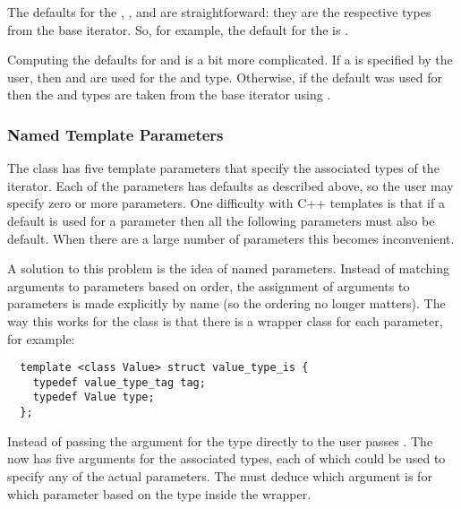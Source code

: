\documentclass{netobjectdays}
\begin{document}
The defaults for the , ,
and  are straightforward: they are the
respective types from the base iterator. So, for example, the default
for the  is
.

Computing the defaults for  and  is a
bit more complicated. If a  is specified by the
user, then  and  are used for
the  and  type. Otherwise, if the
default was used for  then the  and
 types are taken from the base iterator using
.


\subsubsection{Named Template Parameters}
\label{sec:named-template-parameters}

The  class has five template parameters that
specify the associated types of the iterator. Each of the parameters
has defaults as described above, so the user may specify zero or more
parameters. One difficulty with {C++} templates is that if a default
is used for a parameter then all the following parameters must also be
default. When there are a large number of parameters this becomes
inconvenient.

A solution to this problem is the idea of named parameters.  Instead
of matching arguments to parameters based on order, the assignment of
arguments to parameters is made explicitly by name (so the ordering no
longer matters). The way this works for the 
class is that there is a wrapper class for each parameter, for
example:

{\footnotesize
\begin{verbatim} 
  template <class Value> struct value_type_is {
    typedef value_type_tag tag;
    typedef Value type;
  };
\end{verbatim} 
}

Instead of passing the argument for the  type directly to
 the user passes
. The  now has
five arguments for the associated types, each of which could be used
to specify any of the actual parameters. The
 must deduce which argument is for which
parameter based on the  type inside the wrapper.
\end{document}
